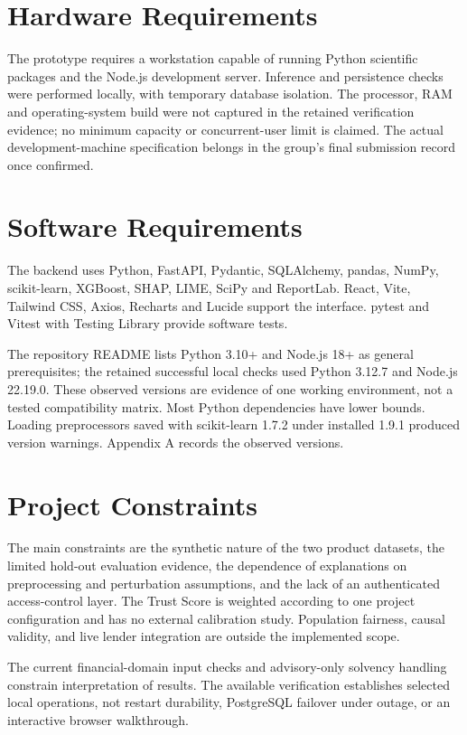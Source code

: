 \documentclass[12pt,a4paper]{report}
\begin{document}
\section{Hardware Requirements}
The prototype requires a workstation capable of running Python scientific packages and the Node.js development server. Inference and persistence checks were performed locally, with temporary database isolation. The processor, RAM and operating-system build were not captured in the retained verification evidence; no minimum capacity or concurrent-user limit is claimed. The actual development-machine specification belongs in the group's final submission record once confirmed.

\section{Software Requirements}
The backend uses Python, FastAPI, Pydantic, SQLAlchemy, pandas, NumPy, scikit-learn, XGBoost, SHAP, LIME, SciPy and ReportLab. React, Vite, Tailwind CSS, Axios, Recharts and Lucide support the interface. pytest and Vitest with Testing Library provide software tests.

The repository README lists Python 3.10+ and Node.js 18+ as general prerequisites; the retained successful local checks used Python 3.12.7 and Node.js 22.19.0. These observed versions are evidence of one working environment, not a tested compatibility matrix. Most Python dependencies have lower bounds. Loading preprocessors saved with scikit-learn 1.7.2 under installed 1.9.1 produced version warnings. Appendix A records the observed versions.

\section{Project Constraints}
The main constraints are the synthetic nature of the two product datasets, the limited hold-out evaluation evidence, the dependence of explanations on preprocessing and perturbation assumptions, and the lack of an authenticated access-control layer. The Trust Score is weighted according to one project configuration and has no external calibration study. Population fairness, causal validity, and live lender integration are outside the implemented scope.

The current financial-domain input checks and advisory-only solvency handling constrain interpretation of results. The available verification establishes selected local operations, not restart durability, PostgreSQL failover under outage, or an interactive browser walkthrough.
\end{document}
